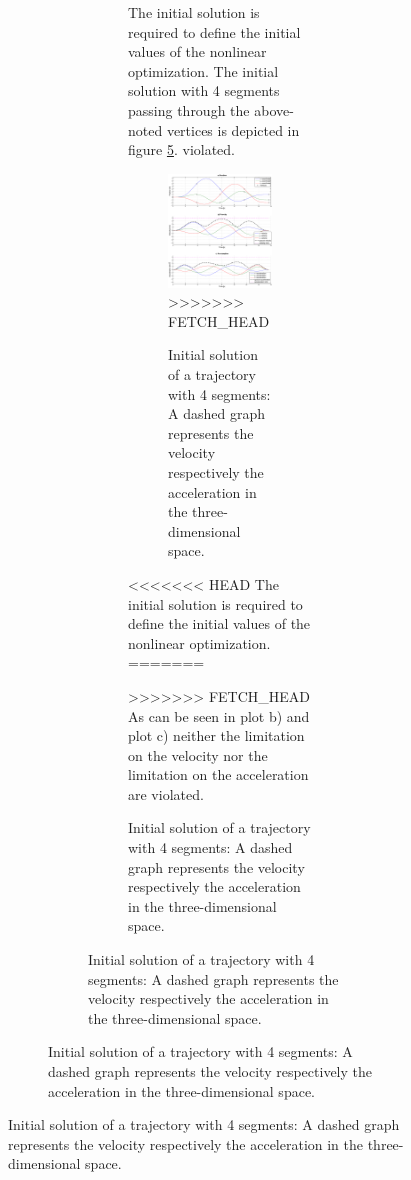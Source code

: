 \begin{figure}[h]
\begin{figure}[H]
\begin{figure}[H]
\begin{figure}[H]
The initial solution is required to define the initial values of the nonlinear optimization. The initial solution with 4 segments passing through  the above-noted vertices is depicted in figure \ref{pic:optimizedSolution4init}. violated.
\vspace*{3\baselineskip}

\begin{figure}[H]
   \centering
   \includegraphics[trim = 35mm 20mm 30mm 37mm,width=1\textwidth]{pics/4SegInit15s67.eps}
>>>>>>> FETCH_HEAD
   \caption{Initial solution of a trajectory with 4 segments: A dashed graph represents the velocity respectively the acceleration in the three-dimensional space.}
   \label{pic:optimizedSolution4init}
\end{figure}
\newpage

<<<<<<< HEAD
The initial solution is required to define the initial values of the nonlinear optimization.
=======

>>>>>>> FETCH_HEAD
As can be seen in plot b) and plot c) neither the limitation on the velocity nor the limitation on the acceleration are violated.




\end{figure}
\end{figure}
\end{figure}
\end{figure}

